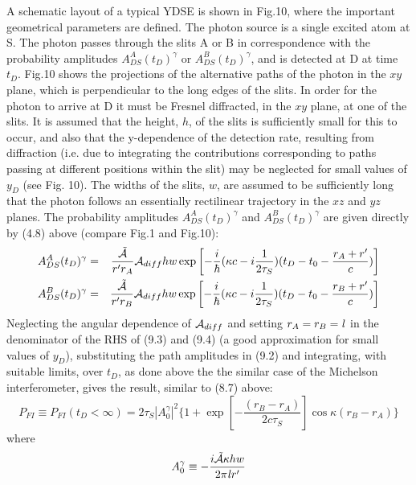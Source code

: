 \documentclass [12pt]{article}
\begin{document}
{   \par A schematic layout of a typical YDSE is shown in Fig.10, where the important geometrical
    parameters are defined. The photon source is a single excited atom at S. The photon passes through
   the slits A or B in correspondence with the probability amplitudes $A_{DS}^A(t_D)^{\gamma}$
    or  $A_{DS}^B(t_D)^{\gamma}$, and is detected at D at time $t_D$.  Fig.10 shows the projections of the alternative
   paths of the photon in the $xy$ plane, which is perpendicular to the long edges of the slits.
    In order for the photon to arrive at D it must be Fresnel diffracted, in the $xy$ plane, at
  one of the slits. It is assumed that the height, $h$, of the slits is sufficiently small
  for this to occur, and also that the y-dependence of the detection rate, resulting from diffraction
   (i.e. due to integrating the contributions corresponding to paths passing at different positions
   within the slit) may be neglected for small values of $y_D$ (see Fig. 10). The widths of the slits, $w$, 
    are assumed to be sufficiently long that the photon follows an essentially rectilinear trajectory 
   in the $xz$ and $yz$ planes. The probability amplitudes $A_{DS}^A(t_D)^{\gamma}$
    and  $A_{DS}^B(t_D)^{\gamma}$ are given directly by (4.8) above (compare Fig.1 and Fig.10):
     \begin{eqnarray}
 A_{DS}^A(t_D)^{\gamma} &  = &  \frac{\tilde{{\cal A}}}{r' r_A} {\cal A}_{diff} h w
   \exp\left[ -\frac{i}{\hbar}(\kappa c-i\frac{1}{2 \tau_S})(t_D-t_0- \frac{r_A+r'}{c})\right] \\
 A_{DS}^B(t_D)^{\gamma} &  = &  \frac{\tilde{{\cal A}}}{r' r_B} {\cal A}_{diff} h w
   \exp\left[ -\frac{i}{\hbar}(\kappa c-i\frac{1}{2 \tau_S})(t_D-t_0- \frac{r_B+r'}{c})\right] 
 \end{eqnarray} 
  Neglecting the angular dependence of $ {\cal A}_{diff}$ and setting $r_A = r_B = {\it l}$ in the 
   denominator of the RHS of (9.3) and (9.4) (a good approximation for small values of
   $y_D$), substituting the path amplitudes in (9.2) and integrating, with suitable limits, over $t_D$,
    as done above the the similar case of the Michelson interferometer, gives the result,
   similar to (8.7)   above:
   \begin{equation}
    P_{FI} \equiv P_{FI}(t_D < \infty) = 2 \tau_S |A_0^{\gamma}|^2\{1+\exp\left[-\frac{(r_B-r_A)}{2 c \tau_S}\right]
   \cos\kappa(r_B-r_A)\}
   \end{equation}
   where
   \begin{equation}
  A_0^{\gamma} \equiv - \frac{i\tilde{{\cal A}} \kappa h w}{2 \pi {\it l} r'}   

\end{equation}}
\end{document}
